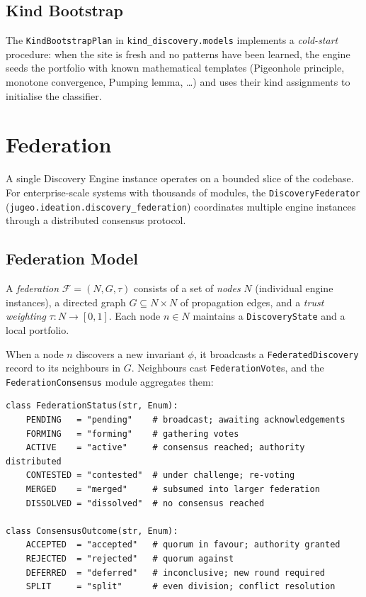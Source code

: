 \documentclass[11pt]{article}
\newcommand{\Fed}{\mathcal{F}}             %
\newcommand{\alg}[1]{\texttt{\small #1}}   %
\begin{document}
\subsection{Kind Bootstrap}

The \texttt{KindBootstrapPlan} in \texttt{kind\_discovery.models}
implements a \emph{cold-start} procedure: when the site is fresh and
no patterns have been learned, the engine seeds the portfolio with
known mathematical templates (Pigeonhole principle, monotone convergence,
Pumping lemma, \ldots) and uses their kind assignments to initialise
the classifier.

\section{Federation}\label{sec:federation}

A single Discovery Engine instance operates on a bounded slice of the
codebase.  For enterprise-scale systems with thousands of modules, the
\alg{DiscoveryFederator}
(\texttt{jugeo.ideation.discovery\_federation}) coordinates multiple
engine instances through a distributed consensus protocol.

\subsection{Federation Model}

\begin{definition}[Federation]
A \emph{federation} $\Fed = (N, G, \tau)$ consists of a set of
\emph{nodes} $N$ (individual engine instances), a directed graph
$G \subseteq N \times N$ of propagation edges, and a
\emph{trust weighting} $\tau : N \to [0,1]$.  Each node $n \in N$
maintains a \texttt{DiscoveryState} and a local portfolio.
\end{definition}

When a node $n$ discovers a new invariant $\phi$, it broadcasts
a \texttt{FederatedDiscovery} record to its neighbours in $G$.
Neighbours cast \texttt{FederationVote}s, and the
\texttt{FederationConsensus} module aggregates them:

\begin{lstlisting}[style=jugeo-python, caption={%
  Federation status and consensus outcome enumerations.}]
class FederationStatus(str, Enum):
    PENDING   = "pending"    # broadcast; awaiting acknowledgements
    FORMING   = "forming"    # gathering votes
    ACTIVE    = "active"     # consensus reached; authority distributed
    CONTESTED = "contested"  # under challenge; re-voting
    MERGED    = "merged"     # subsumed into larger federation
    DISSOLVED = "dissolved"  # no consensus reached

class ConsensusOutcome(str, Enum):
    ACCEPTED  = "accepted"   # quorum in favour; authority granted
    REJECTED  = "rejected"   # quorum against
    DEFERRED  = "deferred"   # inconclusive; new round required
    SPLIT     = "split"      # even division; conflict resolution
\end{lstlisting}
\end{document}
